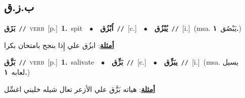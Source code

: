 \documentclass[10pt,a4paper,twoside]{article} %
\begin{document}
\begin{multicols}{2}
\vspace{-3mm}
\subsection*{\color{blue}\foreignlanguage{arabic}{ب.ز.ق}\color{blue}{}} 

{\setlength\topsep{0pt}\textbf{\foreignlanguage{arabic}{بَزَق}}\ {\color{gray}\texttt{//}\color{black}}\ \textsc{verb}\ [p.]\ \textbf{1.}~spit\ \ $\bullet$\ \ \setlength\topsep{0pt}\textbf{\foreignlanguage{arabic}{اُبْزُق}}\ {\color{gray}\texttt{//}\color{black}}\ [c.]\ \ $\bullet$\ \ \setlength\topsep{0pt}\textbf{\foreignlanguage{arabic}{يُبْزُق}}\ {\color{gray}\texttt{//}\color{black}}\ [i.]\ \color{gray}(msa. \foreignlanguage{arabic}{يَبْصُق}~\foreignlanguage{arabic}{\textbf{١.}})\color{black}\  \begin{flushright}\color{gray}\foreignlanguage{arabic}{\textbf{\underline{\foreignlanguage{arabic}{أمثلة}}}: ابزُق علي إِذا بنجح بامتحان بكرا}\end{flushright}\color{black}} \vspace{2mm}

{\setlength\topsep{0pt}\textbf{\foreignlanguage{arabic}{بَزَّق}}\ {\color{gray}\texttt{//}\color{black}}\ \textsc{verb}\ [p.]\ \textbf{1.}~salivate\ \ $\bullet$\ \ \setlength\topsep{0pt}\textbf{\foreignlanguage{arabic}{بَزِّق}}\ {\color{gray}\texttt{//}\color{black}}\ [c.]\ \ $\bullet$\ \ \setlength\topsep{0pt}\textbf{\foreignlanguage{arabic}{يبَزِّق}}\ {\color{gray}\texttt{//}\color{black}}\ [i.]\ \color{gray}(msa. \foreignlanguage{arabic}{يسيل لعابه}~\foreignlanguage{arabic}{\textbf{١.}})\color{black}\  \begin{flushright}\color{gray}\foreignlanguage{arabic}{\textbf{\underline{\foreignlanguage{arabic}{أمثلة}}}: هياته بَزَّق علي الأزعر تعال شيله خليني اغسِّل}\end{flushright}\color{black}} \vspace{2mm}


\end{multicols}
\end{document}
